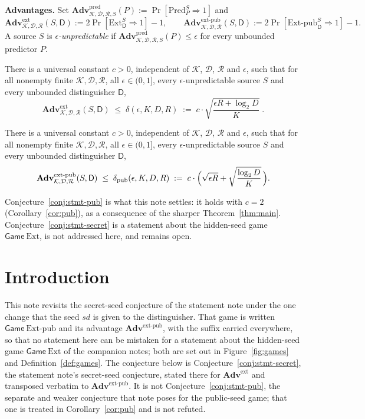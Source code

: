 \documentclass{conjura-solution}
\newcommand{\Adv}{\mathbf{Adv}}
\newcommand{\Gm}{\mathsf{Game}}
\newcommand{\Pred}{\mathrm{Pred}}
\newcommand{\Ext}{\mathrm{Ext}}
\newcommand{\Extp}{\mathrm{Ext}\text{-}\mathrm{pub}}
\newcommand{\pred}{\mathrm{pred}}
\newcommand{\ext}{\mathrm{ext}}
\newcommand{\extp}{\mathrm{ext}\text{-}\mathrm{pub}}
\newcommand{\sd}{\mathit{sd}}
\newcommand{\calK}{\mathcal{K}}
\newcommand{\calD}{\mathcal{D}}
\newcommand{\calR}{\mathcal{R}}
\begin{document}
\medskip
\noindent\textbf{Advantages.}
Set $\Adv^{\pred}_{\calK,\calD,\calR,S}(P) := \Pr[\Pred^{S}_{P} \Rightarrow 1]$ and
\[
  \Adv^{\ext}_{\calK,\calD,\calR}(S,\mathsf{D}) := 2\Pr[\Ext^{S}_{\mathsf{D}} \Rightarrow 1] - 1 ,
  \qquad
  \Adv^{\extp}_{\calK,\calD,\calR}(S,\mathsf{D}) := 2\Pr[\Extp^{S}_{\mathsf{D}} \Rightarrow 1] - 1 .
\]
A source $S$ is \emph{$\epsilon$-unpredictable} if
$\Adv^{\pred}_{\calK,\calD,\calR,S}(P) \le \epsilon$ for every unbounded predictor $P$.

\begin{conjecture}\label{conj:stmt-secret}
There is a universal constant $c > 0$, independent of $\calK$, $\calD$, $\calR$ and $\epsilon$, such
that for all nonempty finite $\calK, \calD, \calR$, all $\epsilon \in (0,1]$, every
$\epsilon$-unpredictable source $S$ and every unbounded distinguisher $\mathsf{D}$,
\[
  \Adv^{\ext}_{\calK,\calD,\calR}(S,\mathsf{D})
  \;\le\; \delta(\epsilon, K, D, R)
  \;:=\; c \cdot \sqrt{\frac{\epsilon R + \log_2 D}{K}} \; .
\]
\end{conjecture}

\begin{conjecture}\label{conj:stmt-pub}
There is a universal constant $c > 0$, independent of $\calK$, $\calD$, $\calR$ and $\epsilon$, such
that for all nonempty finite $\calK, \calD, \calR$, all $\epsilon \in (0,1]$, every
$\epsilon$-unpredictable source $S$ and every unbounded distinguisher $\mathsf{D}$,
\[
  \Adv^{\extp}_{\calK,\calD,\calR}(S,\mathsf{D})
  \;\le\; \delta_{\mathrm{pub}}(\epsilon, K, D, R)
  \;:=\; c \cdot \Bigl( \sqrt{\epsilon R} + \sqrt{\frac{\log_2 D}{K}} \,\Bigr) .
\]
\end{conjecture}

\noindent
Conjecture~\ref{conj:stmt-pub} is what this note settles: it holds with $c = 2$
(Corollary~\ref{cor:pub}), as a consequence of the sharper Theorem~\ref{thm:main}.
Conjecture~\ref{conj:stmt-secret} is a statement about the hidden-seed game $\Gm\ \Ext$, is not
addressed here, and remains open.

\section{Introduction}\label{sec:intro}

This note revisits the secret-seed conjecture of the statement note under the one change that the
seed $\sd$ is given to the distinguisher. That game is written $\Gm\ \Extp$ and its advantage
$\Adv^{\extp}$, with the suffix carried everywhere, so that no statement here can be mistaken for
a statement about the hidden-seed game $\Gm\ \Ext$ of the companion notes; both are set out in
Figure~\ref{fig:games} and Definition~\ref{def:games}. The conjecture below is
Conjecture~\ref{conj:stmt-secret}, the statement note's secret-seed conjecture, stated there for
$\Adv^{\ext}$ and transposed verbatim to $\Adv^{\extp}$. It is not
Conjecture~\ref{conj:stmt-pub}, the separate and weaker conjecture that note poses for the
public-seed game; that one is treated in Corollary~\ref{cor:pub} and is not refuted.
\end{document}
